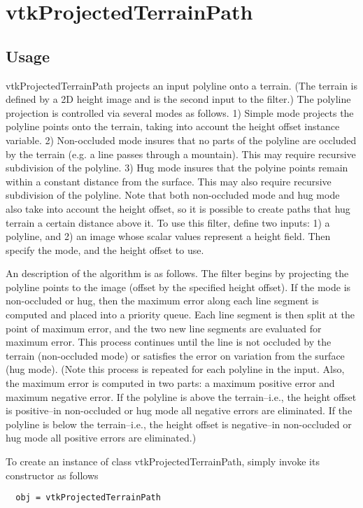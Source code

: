 \section{vtkProjectedTerrainPath}

\subsection{Usage}

 vtkProjectedTerrainPath projects an input polyline onto a terrain. (The
 terrain is defined by a 2D height image and is the second input to the
 filter.) The polyline projection is controlled via several modes as
 follows. 1) Simple mode projects the polyline points onto the terrain,
 taking into account the height offset instance variable. 2) Non-occluded
 mode insures that no parts of the polyline are occluded by the terrain
 (e.g. a line passes through a mountain). This may require recursive
 subdivision of the polyline. 3) Hug mode insures that the polyine points
 remain within a constant distance from the surface. This may also require
 recursive subdivision of the polyline. Note that both non-occluded mode
 and hug mode also take into account the height offset, so it is possible 
 to create paths that hug terrain a certain distance above it. To use this
 filter, define two inputs: 1) a polyline, and 2) an image whose scalar
 values represent a height field. Then specify the mode, and the height
 offset to use.

 An description of the algorithm is as follows. The filter begins by
 projecting the polyline points to the image (offset by the specified
 height offset).  If the mode is non-occluded or hug, then the maximum
 error along each line segment is computed and placed into a priority
 queue. Each line segment is then split at the point of maximum error, and
 the two new line segments are evaluated for maximum error. This process
 continues until the line is not occluded by the terrain (non-occluded
 mode) or satisfies the error on variation from the surface (hug
 mode). (Note this process is repeated for each polyline in the
 input. Also, the maximum error is computed in two parts: a maximum
 positive error and maximum negative error. If the polyline is above the
 terrain--i.e., the height offset is positive--in non-occluded or hug mode
 all negative errors are eliminated. If the polyline is below the
 terrain--i.e., the height offset is negative--in non-occluded or hug mode
 all positive errors are eliminated.)
 

To create an instance of class vtkProjectedTerrainPath, simply
invoke its constructor as follows
\begin{verbatim}
  obj = vtkProjectedTerrainPath
\end{verbatim}
